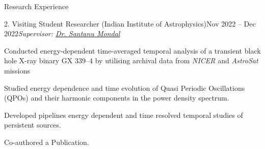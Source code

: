 \begin{rSection}{Research Experience}
\vspace{0.1em}

\hspace{-1.2em}\begin{rSubsection}{2. Visiting Student Researcher (Indian Institute of Astrophysics)}{Nov 2022 -- Dec 2022}{\emph{Supervisor: \href{https://www.iiap.res.in/people/profile/academic/santanu-mondal/}{Dr. Santanu Mondal}}}{}
\item Conducted energy-dependent time-averaged temporal analysis of a transient black hole X-ray binary GX 339--4 by utilising archival data from \textit{NICER} and \textit{AstroSat} missions 
\item Studied energy dependence and time evolution of Quasi Periodic Oscillations (QPOs) and their harmonic
components in the power density spectrum.
\item Developed pipelines energy dependent and time resolved temporal studies of persistent sources. 
\item Co-authored a Publication.
\end{rSubsection}
\end{rSection}
